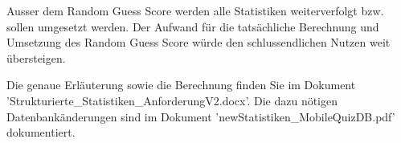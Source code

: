 \noindent Ausser dem Random Guess Score werden alle Statistiken weiterverfolgt bzw. sollen umgesetzt werden. Der Aufwand für die tatsächliche Berechnung und Umsetzung des Random Guess Score würde den schlussendlichen Nutzen weit übersteigen.

\bigskip

Die genaue Erläuterung sowie die Berechnung finden Sie im Dokument \\ 'Strukturierte\_Statistiken\_AnforderungV2.docx'. Die dazu nötigen Datenbankänderungen sind im Dokument 'newStatistiken\_MobileQuizDB.pdf' dokumentiert.